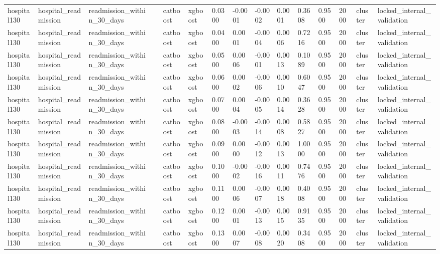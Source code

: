 \begin{tabular}{lllllllllllllll}
hospital130 & hospital\_readmission & readmission\_within\_30\_days &  & catboost & xgboost & 0.0300 & -0.0001 & -0.0002 & 0.0001 & 0.3608 & 0.9500 & 2000 & cluster & locked\_internal\_validation \\
hospital130 & hospital\_readmission & readmission\_within\_30\_days &  & catboost & xgboost & 0.0400 & 0.0001 & -0.0004 & 0.0006 & 0.7216 & 0.9500 & 2000 & cluster & locked\_internal\_validation \\
hospital130 & hospital\_readmission & readmission\_within\_30\_days &  & catboost & xgboost & 0.0500 & 0.0006 & -0.0001 & 0.0013 & 0.1089 & 0.9500 & 2000 & cluster & locked\_internal\_validation \\
hospital130 & hospital\_readmission & readmission\_within\_30\_days &  & catboost & xgboost & 0.0600 & 0.0002 & -0.0006 & 0.0010 & 0.6047 & 0.9500 & 2000 & cluster & locked\_internal\_validation \\
hospital130 & hospital\_readmission & readmission\_within\_30\_days &  & catboost & xgboost & 0.0700 & 0.0004 & -0.0005 & 0.0014 & 0.3628 & 0.9500 & 2000 & cluster & locked\_internal\_validation \\
hospital130 & hospital\_readmission & readmission\_within\_30\_days &  & catboost & xgboost & 0.0800 & -0.0003 & -0.0014 & 0.0008 & 0.5827 & 0.9500 & 2000 & cluster & locked\_internal\_validation \\
hospital130 & hospital\_readmission & readmission\_within\_30\_days &  & catboost & xgboost & 0.0900 & 0.0000 & -0.0012 & 0.0013 & 1.0000 & 0.9500 & 2000 & cluster & locked\_internal\_validation \\
hospital130 & hospital\_readmission & readmission\_within\_30\_days &  & catboost & xgboost & 0.1000 & -0.0002 & -0.0016 & 0.0011 & 0.7476 & 0.9500 & 2000 & cluster & locked\_internal\_validation \\
hospital130 & hospital\_readmission & readmission\_within\_30\_days &  & catboost & xgboost & 0.1100 & 0.0006 & -0.0007 & 0.0018 & 0.4008 & 0.9500 & 2000 & cluster & locked\_internal\_validation \\
hospital130 & hospital\_readmission & readmission\_within\_30\_days &  & catboost & xgboost & 0.1200 & 0.0001 & -0.0013 & 0.0015 & 0.9135 & 0.9500 & 2000 & cluster & locked\_internal\_validation \\
hospital130 & hospital\_readmission & readmission\_within\_30\_days &  & catboost & xgboost & 0.1300 & 0.0007 & -0.0008 & 0.0020 & 0.3408 & 0.9500 & 2000 & cluster & locked\_internal\_validation \\

\end{tabular}
